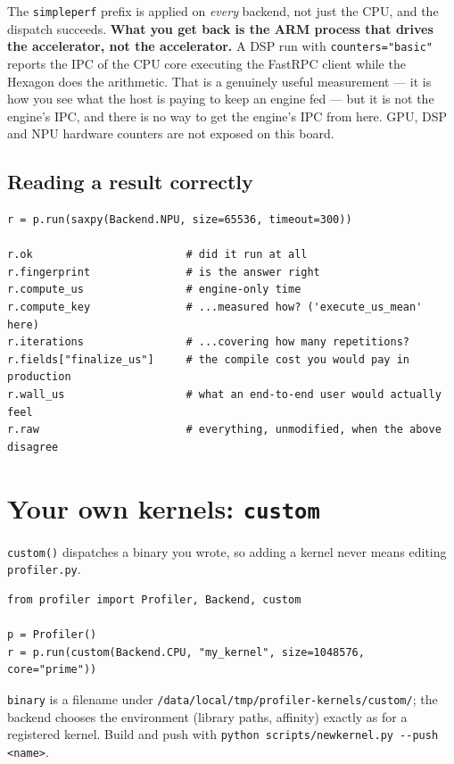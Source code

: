\documentclass[11pt,a4paper]{article}
\newcommand{\code}[1]{\texttt{\let\_\breakableunderscore #1}}
\newcommand{\breakableunderscore}{\textunderscore\allowbreak}
\begin{document}
The \code{simpleperf} prefix is applied on \emph{every} backend, not just the
CPU, and the dispatch succeeds. \textbf{What you get back is the ARM process
that drives the accelerator, not the accelerator.} A DSP run with
\code{counters="basic"} reports the IPC of the CPU core executing the FastRPC
client while the Hexagon does the arithmetic. That is a genuinely useful
measurement --- it is how you see what the host is paying to keep an engine fed
--- but it is not the engine's IPC, and there is no way to get the engine's IPC
from here. GPU, DSP and NPU hardware counters are not exposed on this board.

\subsection{Reading a result correctly}

\begin{lstlisting}
r = p.run(saxpy(Backend.NPU, size=65536, timeout=300))

r.ok                        # did it run at all
r.fingerprint               # is the answer right
r.compute_us                # engine-only time
r.compute_key               # ...measured how? ('execute_us_mean' here)
r.iterations                # ...covering how many repetitions?
r.fields["finalize_us"]     # the compile cost you would pay in production
r.wall_us                   # what an end-to-end user would actually feel
r.raw                       # everything, unmodified, when the above disagree
\end{lstlisting}

\section{Your own kernels: \texttt{custom}}
\label{sec:custom}

\code{custom()} dispatches a binary you wrote, so adding a kernel never means
editing \code{profiler.py}.

\begin{lstlisting}
from profiler import Profiler, Backend, custom

p = Profiler()
r = p.run(custom(Backend.CPU, "my_kernel", size=1048576, core="prime"))
\end{lstlisting}

\code{binary} is a filename under
\code{/data/local/tmp/profiler-kernels/custom/}; the backend chooses the
environment (library paths, affinity) exactly as for a registered kernel. Build
and push with \code{python scripts/new\_kernel.py -{}-push <name>}.
\end{document}
